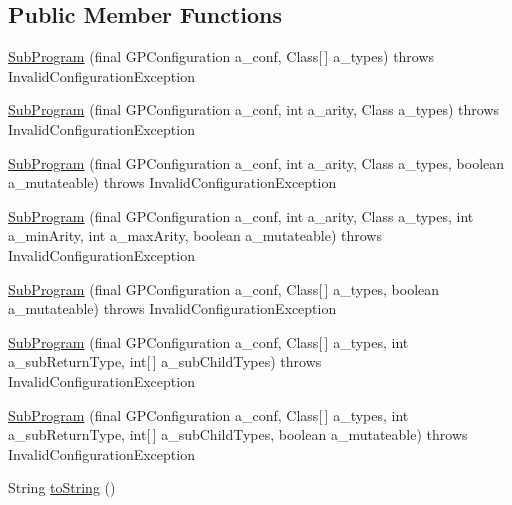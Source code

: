 \subsection*{Public Member Functions}
\begin{DoxyCompactItemize}
\item 
\hyperlink{classorg_1_1jgap_1_1gp_1_1function_1_1_sub_program_a20b16f1c3bce154ea937767eb3cbd838}{Sub\-Program} (final G\-P\-Configuration a\-\_\-conf, Class\mbox{[}$\,$\mbox{]} a\-\_\-types)  throws Invalid\-Configuration\-Exception 
\item 
\hyperlink{classorg_1_1jgap_1_1gp_1_1function_1_1_sub_program_a5ba9a5258c2816e597f81c9948db44b1}{Sub\-Program} (final G\-P\-Configuration a\-\_\-conf, int a\-\_\-arity, Class a\-\_\-types)  throws Invalid\-Configuration\-Exception 
\item 
\hyperlink{classorg_1_1jgap_1_1gp_1_1function_1_1_sub_program_a714df359406dde14a9538baf378b30ec}{Sub\-Program} (final G\-P\-Configuration a\-\_\-conf, int a\-\_\-arity, Class a\-\_\-types, boolean a\-\_\-mutateable)  throws Invalid\-Configuration\-Exception 
\item 
\hyperlink{classorg_1_1jgap_1_1gp_1_1function_1_1_sub_program_aa4290d0c1dc378dfbd768afb2644ac46}{Sub\-Program} (final G\-P\-Configuration a\-\_\-conf, int a\-\_\-arity, Class a\-\_\-types, int a\-\_\-min\-Arity, int a\-\_\-max\-Arity, boolean a\-\_\-mutateable)  throws Invalid\-Configuration\-Exception 
\item 
\hyperlink{classorg_1_1jgap_1_1gp_1_1function_1_1_sub_program_ad3568bf0f8d389ca53b8d02faa70082c}{Sub\-Program} (final G\-P\-Configuration a\-\_\-conf, Class\mbox{[}$\,$\mbox{]} a\-\_\-types, boolean a\-\_\-mutateable)  throws Invalid\-Configuration\-Exception 
\item 
\hyperlink{classorg_1_1jgap_1_1gp_1_1function_1_1_sub_program_a0d5d2162774647d6979baac6fb34b842}{Sub\-Program} (final G\-P\-Configuration a\-\_\-conf, Class\mbox{[}$\,$\mbox{]} a\-\_\-types, int a\-\_\-sub\-Return\-Type, int\mbox{[}$\,$\mbox{]} a\-\_\-sub\-Child\-Types)  throws Invalid\-Configuration\-Exception 
\item 
\hyperlink{classorg_1_1jgap_1_1gp_1_1function_1_1_sub_program_a920cf8417e8b25720f90a73ef54d437d}{Sub\-Program} (final G\-P\-Configuration a\-\_\-conf, Class\mbox{[}$\,$\mbox{]} a\-\_\-types, int a\-\_\-sub\-Return\-Type, int\mbox{[}$\,$\mbox{]} a\-\_\-sub\-Child\-Types, boolean a\-\_\-mutateable)  throws Invalid\-Configuration\-Exception 
\item 
String \hyperlink{classorg_1_1jgap_1_1gp_1_1function_1_1_sub_program_af36cfe9f5306700bfa3c318ce40f31ed}{to\-String} ()

\end{DoxyCompactItemize}
